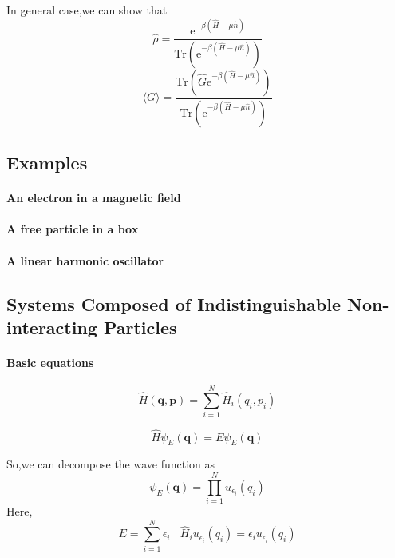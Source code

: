 \documentclass{article}
\begin{document}
In general case,we can show that
\begin{equation}
\widehat{\rho}= \frac{\mathrm{e}^{-\beta (\widehat{H}-\mu \widehat{n})}}{\mathrm{Tr}(\mathrm{e}^{-\beta (\widehat{H}-\mu \widehat{n})})}
\end{equation}
\begin{equation}
\langle G \rangle = \frac{\mathrm{Tr}(\widehat{G} \mathrm{e}^{-\beta (\widehat{H}-\mu \widehat{n})})}{\mathrm{Tr}(\mathrm{e}^{-\beta (\widehat{H}-\mu \widehat{n})})}
\end{equation}

\subsection{Examples}
\paragraph{An electron in a magnetic field}
\paragraph{A free particle in a box}
\paragraph{A linear harmonic oscillator}

\subsection{Systems Composed of Indistinguishable  Non-interacting Particles}
\paragraph{Basic equations}
\begin{equation}
\widehat{H} (\mathbf{q},\mathbf{p}) = \sum_{i=1}^{N} \widehat{H}_{i} (q_i,p_i)
\end{equation}

\begin{equation}
\widehat{H} \psi_E(\mathbf{q}) = E \psi_E(\mathbf{q})
\end{equation}

So,we can decompose the wave function as
\begin{equation}
\psi_E(\mathbf{q}) = \prod_{i=1}^{N} u_{\epsilon_i}(q_i)
\end{equation}
Here,
\begin{equation}
E=\sum_{i=1}^{N} \epsilon_i \ \ \ \  \widehat{H}_i u_{\epsilon_i}(q_i)=\epsilon_i u_{\epsilon_i}(q_i)
\end{equation}
\end{document}

